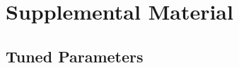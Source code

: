 \documentclass{article}
\renewcommand{\_}[1]{\underline{ #1 }}
\theoremstyle{definition}
\begin{document}
\cleardoublepage
\ifdefined{}
\else
\fi

% 
\nocite{*} %
\printbibliography

\pagebreak


\section[Supplemental Material]{Supplemental Material}
\label{Supplemental Material}

\subsection[Code Parameters]{Tuned Parameters}
\label{Code Parameters}
\end{document}
